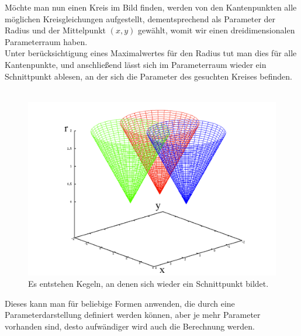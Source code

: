 \documentclass[12pt,a4paper,ngerman]{scrartcl}
\begin{document}
Möchte man nun einen Kreis im Bild finden, werden von den Kantenpunkten alle möglichen Kreisgleichungen aufgestellt, dementsprechend als Parameter der Radius und der Mittelpunkt $(x,y)$ gewählt, womit wir einen dreidimensionalen Parameterraum haben.\\
Unter berücksichtigung eines Maximalwertes für den Radius tut man dies für alle Kantenpunkte, und anschließend lässt sich im Parameterraum wieder ein Schnittpunkt ablesen, an der sich die Parameter des gesuchten Kreises befinden.\\\\
\begin{figure}[H]
  \centering
      \includegraphics[scale=1.1]{img/Hough3.png}
  \caption{Es entstehen Kegeln, an denen sich wieder ein Schnittpunkt bildet.}
\end{figure}
Dieses kann man für beliebige Formen anwenden, die durch eine Parameterdarstellung definiert werden können, aber je mehr Parameter vorhanden sind, desto aufwändiger wird auch die Berechnung werden.
\end{document}
